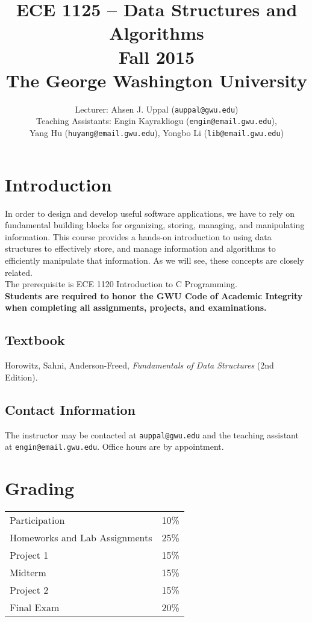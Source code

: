 \documentclass{article}
\title{ECE 1125 -- Data Structures and Algorithms \\ Fall 2015 \\ The George Washington University}
\author{Lecturer: Ahsen J. Uppal (\texttt{auppal@gwu.edu})
\\ Teaching Assistants: Engin Kayrakliogu (\texttt{engin@email.gwu.edu}), \\
Yang Hu (\texttt{huyang@email.gwu.edu}), Yongbo Li (\texttt{lib@email.gwu.edu})}
\date{}
\begin{document}
\maketitle

\section{Introduction}
In order to design and develop useful software applications, we have
to rely on fundamental building blocks for organizing, storing,
managing, and manipulating information. This course provides a
hands-on introduction to using data structures to effectively store,
and manage information and algorithms to efficiently manipulate that
information. As we will see, these concepts are closely related.
\\

The prerequisite is ECE 1120 Introduction to C Programming.
\\

\noindent
\textbf{Students are required to honor the GWU Code of Academic Integrity when completing all assignments, projects, and examinations.}

\subsection{Textbook}
Horowitz, Sahni, Anderson-Freed, \textit{Fundamentals of Data Structures} (2nd Edition).

\subsection{Contact Information}
The instructor may be contacted at \texttt{auppal@gwu.edu} and the teaching assistant at \texttt{engin@email.gwu.edu}. Office hours are by appointment.

\section{Grading}
\begin{center}
\begin{tabular}{|l|l|}
\hline
Participation & 10\% \\
Homeworks and Lab Assignments & 25\% \\
Project 1 &     15\% \\
Midterm   &     15\% \\
Project 2 &     15\% \\
Final Exam &    20\% \\
\hline
\end{tabular}
\end{center}
\end{document}

